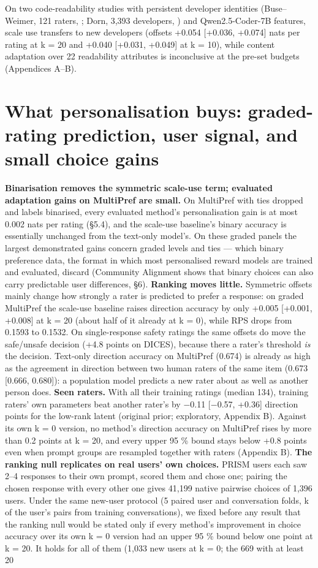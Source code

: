 \documentclass{article}
\begin{document}
On two code-readability studies with persistent developer identities (Buse--Weimer, 121 raters, \citealp{buse2010readability}; Dorn, 3,393 developers, \citealp{dorn2012readability}) and Qwen2.5-Coder-7B features, scale use transfers to new developers (offsets +0.054 {[}+0.036, +0.074{]} nats per rating at k = 20 and +0.040 {[}+0.031, +0.049{]} at k = 10), while content adaptation over 22 readability attributes is inconclusive at the pre-set budgets (Appendices A--B).

\section{What personalisation buys: graded-rating prediction, user signal, and small choice gains}

\textbf{Binarisation removes the symmetric scale-use term; evaluated adaptation gains on MultiPref are small.} On MultiPref with ties dropped and labels binarised, every evaluated method's personalisation gain is at most 0.002 nats per rating (\S{}5.4), and the scale-use baseline's binary accuracy is essentially unchanged from the text-only model's. On these graded panels the largest demonstrated gains concern graded levels and ties --- which binary preference data, the format in which most personalised reward models are trained and evaluated, discard (Community Alignment shows that binary choices can also carry predictable user differences, \S{}6). \textbf{Ranking moves little.} Symmetric offsets mainly change how strongly a rater is predicted to prefer a response: on graded MultiPref the scale-use baseline raises direction accuracy by only +0.005 {[}+0.001, +0.008{]} at k = 20 (about half of it already at k = 0), while RPS drops from 0.1593 to 0.1532. On single-response safety ratings the same offsets do move the safe/unsafe decision (+4.8 points on DICES), because there a rater's threshold \emph{is} the decision. Text-only direction accuracy on MultiPref (0.674) is already as high as the agreement in direction between two human raters of the same item (0.673 {[}0.666, 0.680{]}): a population model predicts a new rater about as well as another person does. \textbf{Seen raters.} With all their training ratings (median 134), training raters' own parameters beat another rater's by $-$0.11 {[}$-$0.57, +0.36{]} direction points for the low-rank latent (original prior; exploratory, Appendix B). Against its own k = 0 version, no method's direction accuracy on MultiPref rises by more than 0.2 points at k = 20, and every upper 95 \% bound stays below +0.8 points even when prompt groups are resampled together with raters (Appendix B). \textbf{The ranking null replicates on real users' own choices.} PRISM users each saw 2--4 responses to their own prompt, scored them and chose one; pairing the chosen response with every other one gives 41,199 native pairwise choices of 1,396 users. Under the same new-user protocol (5 paired user and conversation folds, k of the user's pairs from training conversations), we fixed before any result that the ranking null would be stated only if every method's improvement in choice accuracy over its own k = 0 version had an upper 95 \% bound below one point at k = 20. It holds for all of them (1,033 new users at k = 0; the 669 with at least 20 
\end{document}
